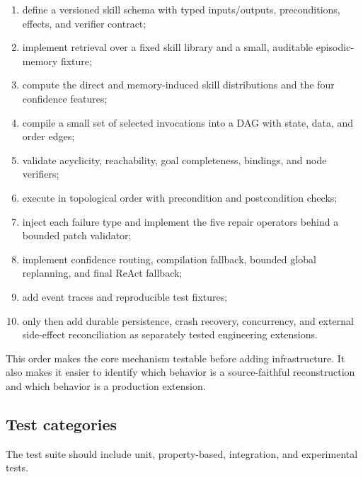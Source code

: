 \begin{enumerate}
  \item define a versioned skill schema with typed inputs/outputs, preconditions, effects, and verifier contract;
  \item implement retrieval over a fixed skill library and a small, auditable episodic-memory fixture;
  \item compute the direct and memory-induced skill distributions and the four confidence features;
  \item compile a small set of selected invocations into a DAG with state, data, and order edges;
  \item validate acyclicity, reachability, goal completeness, bindings, and node verifiers;
  \item execute in topological order with precondition and postcondition checks;
  \item inject each failure type and implement the five repair operators behind a bounded patch validator;
  \item implement confidence routing, compilation fallback, bounded global replanning, and final ReAct fallback;
  \item add event traces and reproducible test fixtures;
  \item only then add durable persistence, crash recovery, concurrency, and external side-effect reconciliation as separately tested engineering extensions.
\end{enumerate}

This order makes the core mechanism testable before adding infrastructure. It also makes it easier to identify which behavior is a source-faithful reconstruction and which behavior is a production extension.

\subsection{Test categories}

The test suite should include unit, property-based, integration, and experimental tests.

